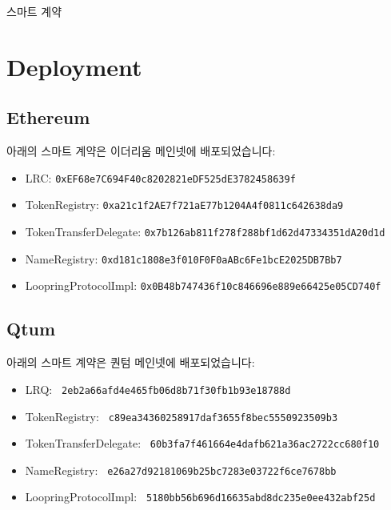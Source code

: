 \documentclass[UTF8,nofonts]{article}
\makeatletter
\newenvironment{figurehere}
 {\def\@captype{figure}}
 {}
\makeatother
\begin{document}
\begin{appendices}
\begin{center}
\begin{figurehere}
\begin{tikzpicture}
\end{tikzpicture} 
\caption{스마트 계약}
\label{fig:smartcontracts}
\end{figurehere}
\end{center}

\section{Deployment}


\subsection{Ethereum}
아래의 스마트 계약은 이더리움 메인넷에 배포되었습니다:
\begin{itemize}
\item LRC: \verb|0xEF68e7C694F40c8202821eDF525dE3782458639f|
\item TokenRegistry: \verb|0xa21c1f2AE7f721aE77b1204A4f0811c642638da9|
\item TokenTransferDelegate: \verb|0x7b126ab811f278f288bf1d62d47334351dA20d1d|
\item NameRegistry: \verb|0xd181c1808e3f010F0F0aABc6Fe1bcE2025DB7Bb7|
\item LoopringProtocolImpl: \verb|0x0B48b747436f10c846696e889e66425e05CD740f|
\end{itemize}

\subsection{Qtum}
아래의 스마트 계약은 퀀텀 메인넷에 배포되었습니다:
\begin{itemize}
\item LRQ: \verb| 2eb2a66afd4e465fb06d8b71f30fb1b93e18788d |
\item TokenRegistry: \verb| c89ea34360258917daf3655f8bec5550923509b3 |
\item TokenTransferDelegate: \verb| 60b3fa7f461664e4dafb621a36ac2722cc680f10 |
\item NameRegistry: \verb| e26a27d92181069b25bc7283e03722f6ce7678bb |
\item LoopringProtocolImpl: \verb| 5180bb56b696d16635abd8dc235e0ee432abf25d |
\end{itemize}

\end{appendices}
\end{document}

